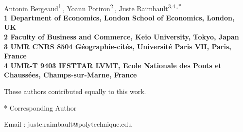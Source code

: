 \documentclass[10pt,A4,draft]{article}
\date{}
\begin{document}
\vspace*{0.35in}


\begin{flushleft}
{\Large
\textbf{}
}
\newline
\\
Antonin Bergeaud\textsuperscript{1,\Yinyang},
Yoann Potiron\textsuperscript{2,\Yinyang},
Juste Raimbault\textsuperscript{3,4,\Yinyang,*}
\\
\bigskip
\bf{1} Department of Economics, London School of Economics, London, UK
\\
\bf{2} Faculty of Business and Commerce, Keio University, Tokyo, Japan
\\
\bf{3} UMR CNRS 8504 G{\'e}ographie-cit{\'e}s, Universit{\'e} Paris VII, Paris, France
\\
\bf{4} UMR-T 9403 IFSTTAR LVMT, Ecole Nationale des Ponts et Chauss{\'e}es, Champs-sur-Marne, France
\\
\bigskip

% 
%
\Yinyang These authors contributed equally to this work.







* Corresponding Author

Email : juste.raimbault@polytechnique.edu

\end{flushleft}
\end{document}
